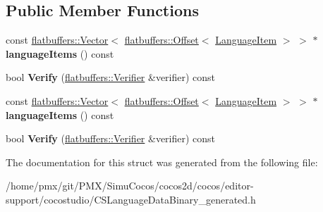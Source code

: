 \subsection*{Public Member Functions}
\begin{DoxyCompactItemize}
\item 
\mbox{\label{structflatbuffers_1_1LanguageSet_ae76744e0530283acb53f39b5fa9a5090}} 
const \hyperlink{classflatbuffers_1_1Vector}{flatbuffers\+::\+Vector}$<$ \hyperlink{structflatbuffers_1_1Offset}{flatbuffers\+::\+Offset}$<$ \hyperlink{structflatbuffers_1_1LanguageItem}{Language\+Item} $>$ $>$ $\ast$ {\bfseries language\+Items} () const
\item 
\mbox{\label{structflatbuffers_1_1LanguageSet_af94cb41b17d53a05a4c1212d38e758bb}} 
bool {\bfseries Verify} (\hyperlink{classflatbuffers_1_1Verifier}{flatbuffers\+::\+Verifier} \&verifier) const
\item 
\mbox{\label{structflatbuffers_1_1LanguageSet_ae76744e0530283acb53f39b5fa9a5090}} 
const \hyperlink{classflatbuffers_1_1Vector}{flatbuffers\+::\+Vector}$<$ \hyperlink{structflatbuffers_1_1Offset}{flatbuffers\+::\+Offset}$<$ \hyperlink{structflatbuffers_1_1LanguageItem}{Language\+Item} $>$ $>$ $\ast$ {\bfseries language\+Items} () const
\item 
\mbox{\label{structflatbuffers_1_1LanguageSet_af94cb41b17d53a05a4c1212d38e758bb}} 
bool {\bfseries Verify} (\hyperlink{classflatbuffers_1_1Verifier}{flatbuffers\+::\+Verifier} \&verifier) const
\end{DoxyCompactItemize}


The documentation for this struct was generated from the following file\+:\begin{DoxyCompactItemize}
\item 
/home/pmx/git/\+P\+M\+X/\+Simu\+Cocos/cocos2d/cocos/editor-\/support/cocostudio/C\+S\+Language\+Data\+Binary\+\_\+generated.\+h\end{DoxyCompactItemize}
